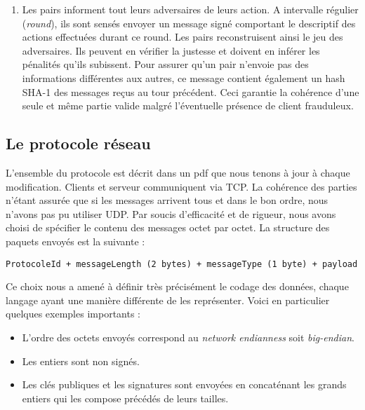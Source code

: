 \documentclass{article}
\begin{document}
\begin{enumerate}
\item
  Les pairs informent tout leurs adversaires de leurs action.
  A intervalle régulier (\textit{round}), ils sont sensés envoyer un message signé comportant le descriptif des actions effectuées durant ce round.
  Les pairs reconstruisent ainsi le jeu des adversaires. Ils peuvent en vérifier la justesse et doivent en inférer les pénalités qu'ils subissent.
  Pour assurer qu'un pair n'envoie pas des informations différentes
  aux autres, ce message contient également un hash SHA-1 des messages reçus au tour précédent.
  Ceci garantie la cohérence d'une seule et même partie valide malgré l'éventuelle présence de client frauduleux.
\end{enumerate}

\subsection{Le protocole réseau}
L'ensemble du protocole est décrit dans un pdf que nous tenons à jour à chaque modification.
Clients et serveur communiquent via TCP.
La cohérence des parties n'étant assurée que si les messages arrivent tous et dans le bon ordre, nous n'avons pas pu utiliser UDP.
Par soucis d'efficacité et de rigueur, nous avons choisi de spécifier le contenu des messages octet par octet.
La structure des paquets envoyés est la suivante :
\begin{verbatim}
ProtocoleId + messageLength (2 bytes) + messageType (1 byte) + payload
\end{verbatim}

Ce choix nous a amené à définir très précisément le codage des données, chaque langage ayant une manière différente de les représenter.
Voici en particulier quelques exemples importants : 

\begin{itemize}
\item L'ordre des octets envoyés correspond au \textit{network endianness} soit \textit{big-endian}.
\item Les entiers sont non signés.
\item Les clés publiques et les signatures sont envoyées en concaténant les grands entiers qui les compose précédés de leurs tailles.
\end{itemize}
\end{document}
